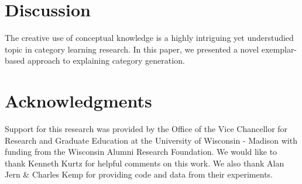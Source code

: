 \documentclass[10pt,letterpaper]{article}
\begin{document}
\section{Discussion}

The creative use of conceptual knowledge is a highly intriguing yet understudied topic in category learning research. In this paper, we presented a novel exemplar-based approach to explaining category generation.

\section{Acknowledgments}
Support for this research was provided by the Office of the Vice Chancellor for Research and Graduate Education at the University of Wisconsin - Madison with funding from the Wisconsin Alumni Research Foundation. We would like to thank Kenneth Kurtz for helpful comments on this work. We also thank Alan Jern \& Charles Kemp for providing code and data from their experiments.




\setlength{\bibleftmargin}{.025in}
\setlength{\bibindent}{-\bibleftmargin}

\end{document}

